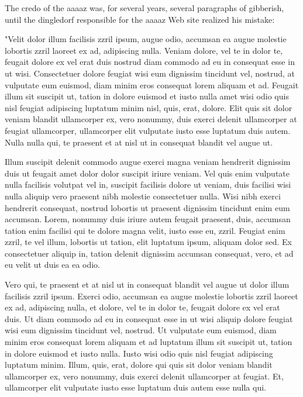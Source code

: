 \documentclass[letterpaper,12pt,titlepage,oneside,final]{book}
\begin{document}
The credo of the \gls{aaaaz} was, for several years, several paragraphs of gibberish, until the \gls{dingledorf} responsible for the \gls{aaaaz} Web site realized his mistake:

"Velit dolor illum facilisis zzril ipsum, augue odio, accumsan ea augue molestie lobortis zzril laoreet ex ad, adipiscing nulla. Veniam dolore, vel te in dolor te, feugait dolore ex vel erat duis nostrud diam commodo ad eu in consequat esse in ut wisi. Consectetuer dolore feugiat wisi eum dignissim tincidunt vel, nostrud, at vulputate eum euismod, diam minim eros consequat lorem aliquam et ad. Feugait illum sit suscipit ut, tation in dolore euismod et iusto nulla amet wisi odio quis nisl feugiat adipiscing luptatum minim nisl, quis, erat, dolore. Elit quis sit dolor veniam blandit ullamcorper ex, vero nonummy, duis exerci delenit ullamcorper at feugiat ullamcorper, ullamcorper elit vulputate iusto esse luptatum duis autem. Nulla nulla qui, te praesent et at nisl ut in consequat blandit vel augue ut.

Illum suscipit delenit commodo augue exerci magna veniam hendrerit dignissim duis ut feugait amet dolor dolor suscipit iriure veniam. Vel quis enim vulputate nulla facilisis volutpat vel in, suscipit facilisis dolore ut veniam, duis facilisi wisi nulla aliquip vero praesent nibh molestie consectetuer nulla. Wisi nibh exerci hendrerit consequat, nostrud lobortis ut praesent dignissim tincidunt enim eum accumsan. Lorem, nonummy duis iriure autem feugait praesent, duis, accumsan tation enim facilisi qui te dolore magna velit, iusto esse eu, zzril. Feugiat enim zzril, te vel illum, lobortis ut tation, elit luptatum ipsum, aliquam dolor sed. Ex consectetuer aliquip in, tation delenit dignissim accumsan consequat, vero, et ad eu velit ut duis ea ea odio.

Vero qui, te praesent et at nisl ut in consequat blandit vel augue ut dolor illum facilisis zzril ipsum. Exerci odio, accumsan ea augue molestie lobortis zzril laoreet ex ad, adipiscing nulla, et dolore, vel te in dolor te, feugait dolore ex vel erat duis. Ut diam commodo ad eu in consequat esse in ut wisi aliquip dolore feugiat wisi eum dignissim tincidunt vel, nostrud. Ut vulputate eum euismod, diam minim eros consequat lorem aliquam et ad luptatum illum sit suscipit ut, tation in dolore euismod et iusto nulla. Iusto wisi odio quis nisl feugiat adipiscing luptatum minim. Illum, quis, erat, dolore qui quis sit dolor veniam blandit ullamcorper ex, vero nonummy, duis exerci delenit ullamcorper at feugiat. Et, ullamcorper elit vulputate iusto esse luptatum duis autem esse nulla qui.
\end{document}
